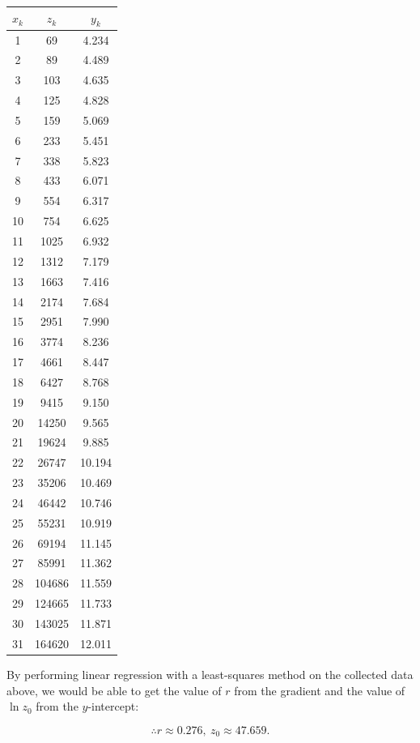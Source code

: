 \documentclass[11pt,fancychapters]{article}
\begin{document}
\begin{center}
\begin{tabular}{ ||c|c|c|| } 
\hline
$x_k$ & $z_k$ & $y_k$ \\ 
\hline\hline
1 & 69 & 4.234 \\
2 & 89 & 4.489 \\
3 & 103 & 4.635 \\
4 & 125 & 4.828 \\
5 & 159 & 5.069 \\
6 & 233 & 5.451 \\
7 & 338 & 5.823 \\
8 & 433 & 6.071 \\
9 & 554 & 6.317 \\
10 & 754 & 6.625 \\
11 & 1025 & 6.932 \\
12 & 1312 & 7.179 \\
13 & 1663 & 7.416 \\
14 & 2174 & 7.684 \\
15 & 2951 & 7.990 \\
16 & 3774 & 8.236 \\
17 & 4661 & 8.447 \\
18 & 6427 & 8.768 \\
19 & 9415 & 9.150 \\
20 & 14250 & 9.565 \\
21 & 19624 & 9.885 \\
22 & 26747 & 10.194 \\
23 & 35206 & 10.469 \\
24 & 46442 & 10.746 \\
25 & 55231 & 10.919 \\
26 & 69194 & 11.145 \\
27 & 85991 & 11.362 \\
28 & 104686 & 11.559 \\
29 & 124665 & 11.733 \\
30 & 143025 & 11.871 \\
31 & 164620 & 12.011 \\
\hline
\end{tabular}
\end{center}

By performing linear regression with a least-squares method on the collected data above, we would be able to get the value of $r$ from the gradient and the value of $\ln{z_0}$ from the $y$-intercept:

\begin{tcolorbox}
\begin{equation}\label{eqn3b1}
    \therefore r \approx 0.276, ~
    z_0 \approx 47.659.
\end{equation}
\end{tcolorbox}
\end{document}
